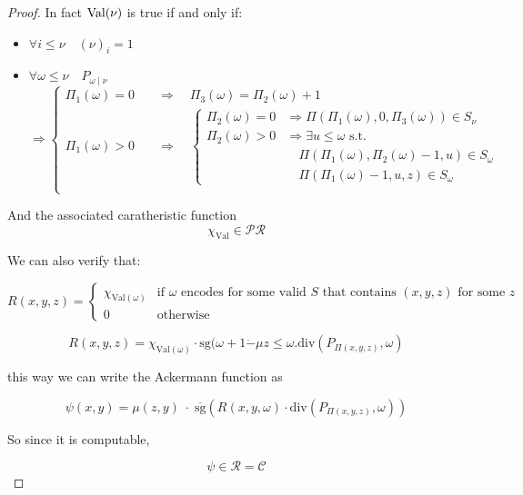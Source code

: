 \begin{theorem}
\begin{proof}
    In fact $\text{Val}(\nu)$ is true if and only if:
    \begin{itemize}
    \item \(\forall i \leq \nu \quad (\nu)_i = 1\)
    \item{
        \( \forall \omega \leq \nu \quad P_{\omega \; | \; \nu}\) \\
        \[\Rightarrow \begin{cases}
            \Pi_1(\omega) = 0 \quad & \Rightarrow
            \quad \Pi_3(\omega) = \Pi_2(\omega) + 1 \\
            \Pi_1(\omega) > 0 \quad & \Rightarrow \quad
            \begin{cases}
              \Pi_2(\omega) = 0 & \Rightarrow
              \Pi(\Pi_1(\omega),0,\Pi_3(\omega)) \in S_\nu \\
              \Pi_2(\omega) > 0 & \Rightarrow
              \exists u \leq \omega \text{ s.t. } \\
              & \quad \Pi(\Pi_1(\omega), \Pi_2(\omega)-1,u) \in S_\omega \\
              & \quad \Pi(\Pi_1(\omega)-1, u,z) \in S_\omega
            \end{cases}
            \\
          \end{cases}
        \]
      }
    \end{itemize}

    And the associated caratheristic function
    \[\chi_{\text{Val}} \in \mathcal{PR}\]

    We can also verify that:

    \[
      R(x,y,z) = \begin{cases}

        \chi_{\text{Val}(\omega)} & \text{if $\omega$ encodes for some
          valid $S$ that contains $(x,y,z)$ for some $z$} \\

        0 & \text{otherwise}

      \end{cases}
    \]

    \[
      R(x,y,z) = \chi_{\text{Val}(\omega)} \cdot \text{sg} (\omega + 1
      \dot{-} \mu z \leq \omega . \text{div}(P_{\Pi(x,y,z)}, \omega)
    \]

    this way we can write the Ackermann function as

    \[
      \psi(x,y) = \mu (z,y) \; \cdot \; \overline{\text{sg}}(R(x,y,\omega)
      \cdot \text{div}(P_{\Pi(x,y,z)}, \omega))
    \]

    So since it is computable,

    \[
      \psi \in \mathcal{R} = \mathcal{C}
    \]

  \end{proof}
\end{theorem}

